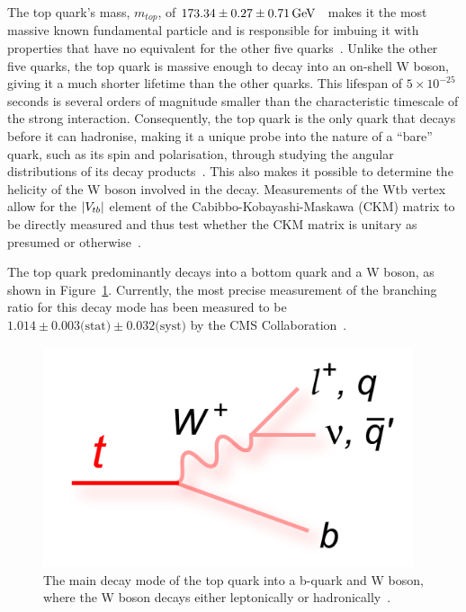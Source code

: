 The top quark's mass, $m_{top}$, of $173.34 \pm 0.27 \pm 0.71 \,\text{Ge\hspace{-.08em}V}$~\cite{Tanabashi:2018oca} makes it the most massive known fundamental particle and is responsible for imbuing it with properties that have no equivalent for the other five quarks~\cite{Tanabashi:2018oca}.
Unlike the other five quarks, the top quark is massive enough to decay into an on-shell W boson, giving it a much shorter lifetime than the other quarks.
This lifespan of $5 \times 10^{-25}$ seconds is several orders of magnitude smaller than the characteristic timescale of the strong interaction.
Consequently, the top quark is the only quark that decays before it can hadronise, making it a unique probe into the nature of a ``bare'' quark, such as its spin and polarisation, through studying the angular distributions of its decay products~\cite{Khachatryan:2015dzz}.
This also makes it possible to determine the helicity of the W boson involved in the decay.
Measurements of the Wtb vertex allow for the $\lvert V_{tb} \rvert$ element of the Cabibbo-Kobayashi-Maskawa (CKM) matrix to be directly measured and thus test whether the CKM matrix is unitary as presumed or otherwise~\cite{Shibata:2008sy}.

The top quark predominantly decays into a bottom quark and a W boson, as shown in Figure~\ref{fig:topDecay}.
Currently, the most precise measurement of the branching ratio for this decay mode has been measured to be $1.014 \pm 0.003 \textrm{(stat)} \pm 0.032 \textrm{(syst)}$ by the CMS Collaboration~\cite{Khachatryan:2014nda}.

\begin{figure}[htbp]
\begin{center}
\includegraphics[width=0.97\textwidth]{figs/top-physics/topDecay.png}
\caption{The main decay mode of the top quark into a b-quark and W boson, where the W boson decays either leptonically or hadronically~\cite{topDiagrams}.}
\label{fig:topDecay}
\end{center}
\end{figure}

